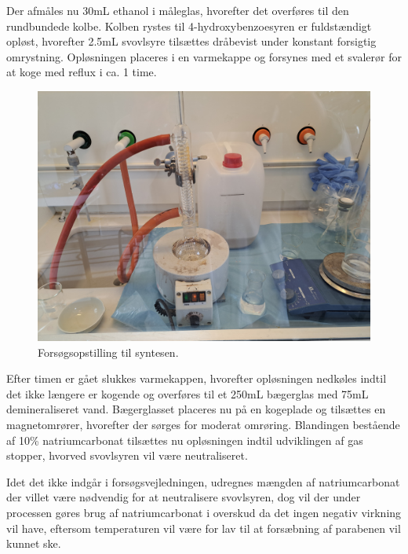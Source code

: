     Der afmåles nu 30mL ethanol i måleglas, hvorefter det overføres til den rundbundede kolbe. Kolben rystes til 4-hydroxybenzoesyren er fuldstændigt opløst, hvorefter 2.5mL svovlsyre tilsættes dråbevist under konstant forsigtig omrystning. Opløsningen placeres i en varmekappe og forsynes med et svalerør for at koge med reflux i ca. 1 time.
    \begin{figure}[H]
        \includegraphics[width=\textwidth]{billeder/opstilling}
        \caption{Forsøgsopstilling til syntesen.}
    \end{figure}
    Efter timen er gået slukkes varmekappen, hvorefter opløsningen nedkøles indtil det ikke længere er kogende og overføres til et 250mL bægerglas med 75mL demineraliseret vand. Bægerglasset placeres nu på en kogeplade og tilsættes en magnetomrører, hvorefter der sørges for moderat omrøring. Blandingen bestående af 10\% natriumcarbonat tilsættes nu opløsningen indtil udviklingen af gas stopper, hvorved svovlsyren vil være neutraliseret.

    Idet det ikke indgår i forsøgsvejledningen, udregnes mængden af natriumcarbonat der villet være nødvendig for at neutralisere svovlsyren, dog vil der under processen gøres brug af natriumcarbonat i overskud da det ingen negativ virkning vil have, eftersom temperaturen vil være for lav til at forsæbning af parabenen vil kunnet ske.

